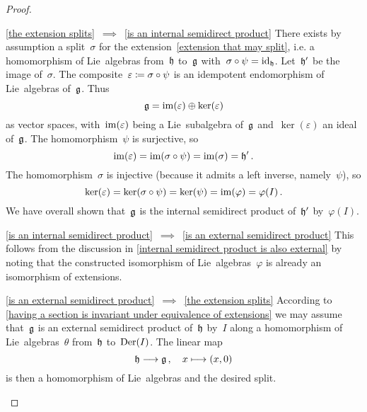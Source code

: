 \begin{proof}
  \leavevmode
  \begin{implicationlist}
    \item[\ref{the extension splits}~$\implies$~\ref{is an internal semidirect product}]
      There exists by assumption a split~$\sigma$ for the extension~\eqref{extension that may split}, i.e. a homomorphism of Lie~algebras from~$\mathfrak{h}$ to~$\mathfrak{g}$ with~$\sigma \circ \psi = \mathrm{id}_{\mathfrak{h}}$.
      Let~$\mathfrak{h}'$ be the image of~$\sigma$.
      The composite~$\varepsilon \coloneqq \sigma \circ \psi$ is an idempotent endomorphism of Lie~algebras of~$\mathfrak{g}$.
      Thus
      \[
        \mathfrak{g}
        =
        \operatorname{im}(\varepsilon) \oplus \ker(\varepsilon)
      \]
      as vector spaces, with~$\operatorname{im}(\varepsilon)$ being a Lie~subalgebra of~$\mathfrak{g}$ and~$\ker(\varepsilon)$ an ideal of~$\mathfrak{g}$.
      The homomorphism~$\psi$ is surjective, so
      \[
        \operatorname{im}(\varepsilon)
        =
        \operatorname{im}(\sigma \circ \psi)
        =
        \operatorname{im}(\sigma)
        =
        \mathfrak{h}' \,.
      \]
      The homomorphism~$\sigma$ is injective (because it admits a left inverse, namely~$\psi$), so
      \[
        \ker(\varepsilon)
        =
        \ker(\sigma \circ \psi)
        =
        \ker(\psi)
        =
        \operatorname{im}(\varphi)
        =
        \varphi(I) \,.
      \]
      We have overall shown that~$\mathfrak{g}$ is the internal semidirect product of~$\mathfrak{h}'$ by~$\varphi(I)$.
    \item[\ref{is an internal semidirect product}~$\implies$~\ref{is an external semidirect product}]
      This follows from the discussion in \cref{internal semidirect product is also external} by noting that the constructed isomorphism of Lie~algebras~$\varphi$ is already an isomorphism of extensions.
    \item[\ref{is an external semidirect product}~$\implies$~\ref{the extension splits}]
      According to \cref{having a section is invariant under equivalence of extensions} we may assume that~$\mathfrak{g}$ is an external semidirect product of~$\mathfrak{h}$ by~$I$ along a homomorphism of Lie~algebras~$\theta$ from~$\mathfrak{h}$ to~$\operatorname{Der}(I)$.
      The linear map
      \[
        \hlie
        \to
        \glie \,,
        \quad
        x
        \mapsto
        (x,0)
      \]
      is then a homomorphism of Lie~algebras and the desired split.
    \qedhere
  \end{implicationlist}
\end{proof}


